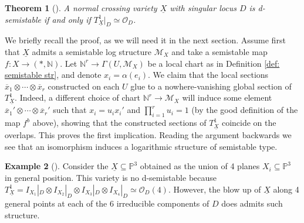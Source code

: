 \documentclass[reqno]{amsart}
\newcommand\N{\mathbb{N}}
\renewcommand\P{\mathbb{P}}
\newcommand{\OO}{\mathcal{O}}
\newcommand{\M}{\mathcal{M}}
\newcounter{Theorem}
\newtheorem{theorem}{Theorem}[section]
\theoremstyle{definition}
\newtheorem{example}[theorem]{Example}
\theoremstyle{named}
\begin{document}
\begin{theorem}[{{\cite[Prop. 1.1]{kawamata1994logarithmic}}}]{\label{thm: semistability_T1}} 
A normal crossing variety $\underline{X}$ with singular locus $D$ is d-semistable if and only if $T_{\underline{X}}^1\big\vert_D \simeq \OO_D$.    
\end{theorem}

We briefly recall the proof, as we will need it in the next section. Assume first that $\underline{X}$ admits a semistable log structure $\M_X$ and take a semistable map $f:X\to (\ast, \N)$. Let  $\N^r\to \Gamma(U,\M_X)$ be a local chart as in Definition \ref{def: semistable str}, and denote $x_i=\alpha(e_i)$. We claim that the local sections $\overline{x}_1\otimes \cdots \otimes \overline{x}_r$ constructed on each $U$ glue to a nowhere-vanishing global section of $T^1_{\underline{X}}$. Indeed, a different choice of chart $\N^r\to \M_X$ will induce some element  $\overline{x}_1'\otimes \cdots \otimes \overline{x}_r'$ such that $x_i=u_i x_i'$ and $\prod_{i=1}^r u_i=1$ (by the good definition of the map $f^b$ above), showing that the constructed sections of $T^1_{\underline{X}}$ coincide on the overlaps. This proves the first implication. Reading the argument backwards we see that an isomorphism \smash{$(T^1_X\big\vert_D)^\vee\simeq \OO_D$} induces a logarithmic structure of semistable type.

\begin{example}[\cite{friedman1983global}]
Consider the  $\underline{X}\subseteq \P^3$ obtained as the union of 4 planes $X_i\subseteq \P^3$ in general position. This variety is no d-semistable because $T_{\underline{X}}^1 = I_{X_1}|_D\otimes I_{X_2}|_D\otimes I_{X_3}|_D\otimes I_{X_4}|_D \simeq \OO_D(4)$. However, the blow up of $\underline{X}$ along 4 general points at each of the 6 irreducible components of $D$ does admits such structure.
\end{example}
\end{document}
